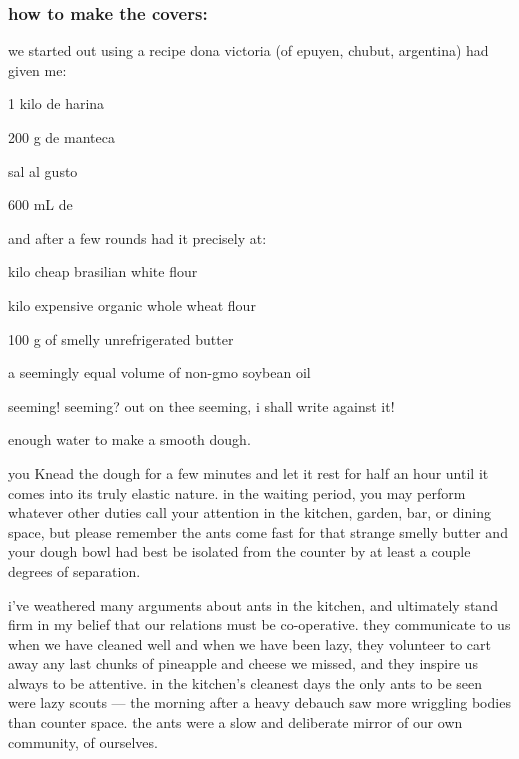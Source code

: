 \subsubsection{how to make the covers:}

we started out using a recipe dona victoria (of epuyen, chubut,
argentina) had given me:

\begin{ingredients}
  \item 1 kilo de \gls{harina}
  \item 200 g de \gls{manteca}
  \item sal al gusto
  \item 600 mL de 
\end{ingredients}

and after a few rounds  had it precisely at:

\begin{ingredients}
  \item \onehalf kilo cheap brasilian white flour
  \item \onehalf kilo expensive organic whole wheat flour
  \item 100 g of smelly unrefrigerated butter
  \item a seemingly equal volume of non-gmo soybean oil
\end{ingredients}

seeming! seeming? out on thee seeming, i shall write against it!

\begin{ingredients}
  \item enough water to make a smooth dough.
\end{ingredients}

you Knead the dough for a few minutes and let it rest for half an hour
until it comes into its truly elastic nature. in the waiting period,
you may perform whatever other duties call your attention in the
kitchen, garden, bar, or dining space, but please remember the ants
come fast for that strange smelly butter and your dough bowl had best
be isolated from the counter by at least a couple degrees of
separation.

i've weathered many arguments about ants in the kitchen, and
ultimately stand firm in my belief that our relations must be
co-operative. they communicate to us when we have cleaned well and
when we have been lazy, they volunteer to cart away any last chunks of
pineapple and cheese we missed, and they inspire us always to be
attentive. in the kitchen's cleanest days the only ants to be seen
were lazy scouts --- the morning after a heavy debauch saw more
wriggling bodies than counter space. the ants were a slow and
deliberate mirror of our own community, of ourselves.

